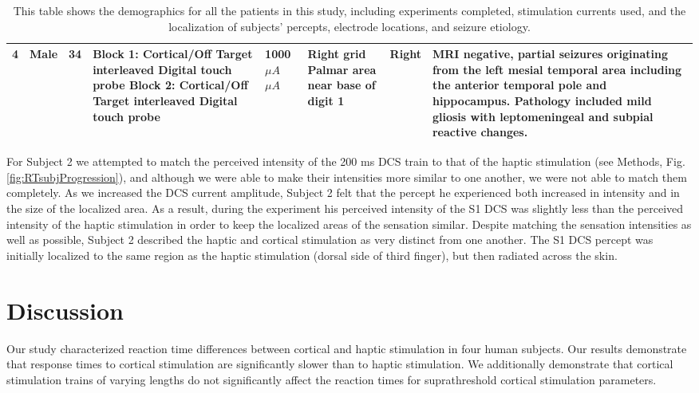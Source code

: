 \begin{table}[ht]
\begin{tabularx}{\textwidth}{@{}lllXXXlX@{}}
		4 & Male & 34 &  \textbf{Block 1:} Cortical/Off Target interleaved \newline Digital touch probe \newline \newline \textbf{Block 2:} Cortical/Off Target interleaved \newline Digital touch probe  & 1000 $\mu A$ \newline \newline \newline \newline 1200  $ \mu A $  &  Right grid \newline Palmar area near base of digit 1 & Right  & 
		MRI negative, partial seizures originating from the left mesial temporal area including the anterior temporal pole and hippocampus. Pathology included mild gliosis with leptomeningeal and subpial reactive changes.  \\
				\bottomrule
	\end{tabularx}
	\caption[Subject Demographics. ]{This table shows the demographics for all the patients in this study, including experiments completed, stimulation currents used, and the localization of subjects’ percepts, electrode locations, and seizure etiology.}
	\label{table:RTperceptLocale}
\end{table}


For Subject 2 we attempted to match the perceived intensity of the 200 ms DCS train to that of the haptic stimulation (see Methods, Fig. \ref{fig:RTsubjProgression}), and although we were able to make their intensities more similar to one another, we were not able to match them completely. As we increased the DCS current amplitude, Subject 2 felt that the percept he experienced both increased in intensity and in the size of the localized area. As a result, during the experiment his perceived intensity of the S1 DCS was slightly less than the perceived intensity of the haptic stimulation in order to keep the localized areas of the sensation similar. Despite matching the sensation intensities as well as possible, Subject 2 described the haptic and cortical stimulation as very distinct from one another. The S1 DCS percept was initially localized to the same region as the haptic stimulation (dorsal side of third finger), but then radiated across the skin.


\section{Discussion}
Our study characterized reaction time differences between cortical and haptic stimulation in four human subjects. Our results demonstrate that response times to cortical stimulation are significantly slower than to haptic stimulation. We additionally demonstrate that cortical stimulation trains of varying lengths do not significantly affect the reaction times for suprathreshold cortical stimulation parameters.

